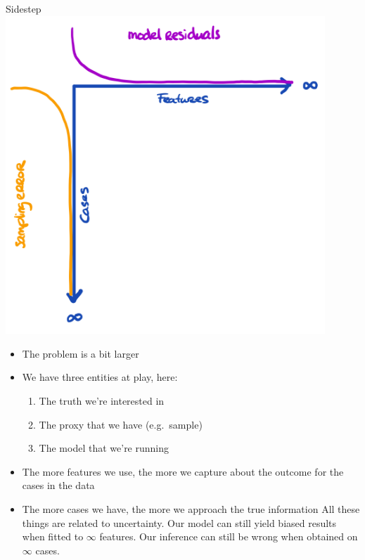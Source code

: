 \documentclass[
  ignorenonframetext,
]{beamer}
\providecommand{\tightlist}{%
  \setlength{\itemsep}{0pt}\setlength{\parskip}{0pt}}\usepackage{longtable,booktabs,array}
\begin{document}
\begin{frame}{Sidestep}
\protect\hypertarget{sidestep}{}
\includegraphics[width=0.9\textwidth,height=\textheight]{img/4. sidestep1.png}

\begin{itemize}
\item
  The problem is a bit larger
\item
  We have three entities at play, here:

  \begin{enumerate}
  \tightlist
  \item
    The truth we're interested in
  \item
    The proxy that we have (e.g.~sample)
  \item
    The model that we're running
  \end{enumerate}
\item
  The more features we use, the more we capture about the outcome for
  the cases in the data
\item
  The more cases we have, the more we approach the true information All
  these things are related to uncertainty. Our model can still yield
  biased results when fitted to \(\infty\) features. Our inference can
  still be wrong when obtained on \(\infty\) cases.
\end{itemize}
\end{frame}
\end{document}
